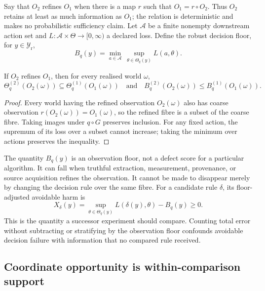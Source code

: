 Say that $O_2$ refines $O_1$ when there is a map $r$ such that
$O_1=r\circ O_2$. Thus $O_2$ retains at least as much information as $O_1$;
the relation is deterministic and makes no probabilistic sufficiency claim.
Let $\mathcal A$ be a finite nonempty downstream action set and
$L:\mathcal A\times\Theta\to[0,\infty)$ a declared loss. Define the robust
decision floor, for $y\in\mathcal Y_{\mathrm r}$,
\begin{equation}
  B_q(y)=\min_{a\in\mathcal A}\ \sup_{\theta\in\Theta_q(y)}L(a,\theta).
  \label{eq:decision-floor}
\end{equation}

\begin{theorem}
\label{thm:refinement}
If $O_2$ refines $O_1$, then for every realised world $\omega$,
\begin{equation}
 \Theta^{(2)}_q(O_2(\omega))
 \subseteq
 \Theta^{(1)}_q(O_1(\omega))
 \quad\text{and}\quad
 B^{(2)}_q(O_2(\omega))\leq B^{(1)}_q(O_1(\omega)).
\end{equation}
\end{theorem}

\begin{proof}
Every world having the refined observation $O_2(\omega)$ also has coarse
observation $r(O_2(\omega))=O_1(\omega)$, so the refined fibre is a subset of
the coarse fibre. Taking images under $q\circ G$ preserves inclusion. For any
fixed action, the supremum of its loss over a subset cannot increase; taking
the minimum over actions preserves the inequality.
\end{proof}

The quantity $B_q(y)$ is an observation floor, not a defect score for a
particular algorithm. It can fall when truthful extraction, measurement,
provenance, or source acquisition refines the observation. It cannot be made
to disappear merely by changing the decision rule over the same fibre. For a
candidate rule $\delta$, its floor-adjusted avoidable harm is
\begin{equation}
 X_\delta(y)=
 \sup_{\theta\in\Theta_q(y)}L(\delta(y),\theta)-B_q(y)\geq 0.
 \label{eq:excess-harm}
\end{equation}
This is the quantity a successor experiment should compare. Counting total
error without subtracting or stratifying by the observation floor confounds
avoidable decision failure with information that no compared rule received.

\subsection{Coordinate opportunity is within-comparison support}

